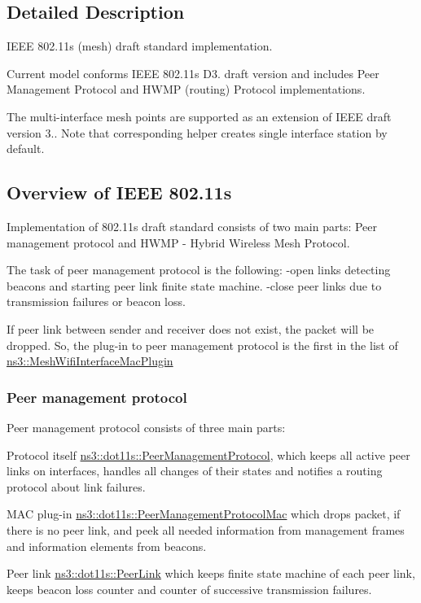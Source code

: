 \subsection{Detailed Description}
I\+E\+EE 802.\+11s (mesh) draft standard implementation. 

Current model conforms I\+E\+EE 802.\+11s D3. draft version and includes Peer Management Protocol and H\+W\+MP (routing) Protocol implementations.

The multi-\/interface mesh points are supported as an extension of I\+E\+EE draft version 3.. Note that corresponding helper creates single interface station by default. \hypertarget{group__dot11s_Dot11s}{}\subsection{Overview of I\+E\+E\+E 802.\+11s}\label{group__dot11s_Dot11s}
Implementation of 802.\+11s draft standard consists of two main parts\+: Peer management protocol and H\+W\+MP -\/ Hybrid Wireless Mesh Protocol.

The task of peer management protocol is the following\+: -\/open links detecting beacons and starting peer link finite state machine. -\/close peer links due to transmission failures or beacon loss.

If peer link between sender and receiver does not exist, the packet will be dropped. So, the plug-\/in to peer management protocol is the first in the list of \hyperlink{classns3_1_1MeshWifiInterfaceMacPlugin}{ns3\+::\+Mesh\+Wifi\+Interface\+Mac\+Plugin} \hypertarget{group__dot11s_PMP}{}\subsubsection{Peer management protocol}\label{group__dot11s_PMP}
Peer management protocol consists of three main parts\+:
\begin{DoxyItemize}
\item Protocol itself \hyperlink{classns3_1_1dot11s_1_1PeerManagementProtocol}{ns3\+::dot11s\+::\+Peer\+Management\+Protocol}, which keeps all active peer links on interfaces, handles all changes of their states and notifies a routing protocol about link failures.
\item M\+AC plug-\/in \hyperlink{classns3_1_1dot11s_1_1PeerManagementProtocolMac}{ns3\+::dot11s\+::\+Peer\+Management\+Protocol\+Mac} which drops packet, if there is no peer link, and peek all needed information from management frames and information elements from beacons.
\item Peer link \hyperlink{classns3_1_1dot11s_1_1PeerLink}{ns3\+::dot11s\+::\+Peer\+Link} which keeps finite state machine of each peer link, keeps beacon loss counter and counter of successive transmission failures.
\end{DoxyItemize}

